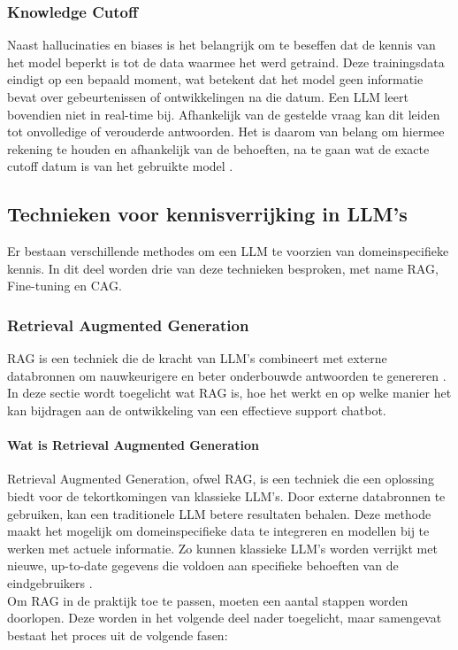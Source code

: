 \subsubsection{Knowledge Cutoff}
Naast hallucinaties en biases is het belangrijk om te beseffen dat de kennis van het model beperkt is tot de data waarmee het werd getraind. Deze trainingsdata eindigt op een bepaald moment, wat betekent dat het model geen informatie bevat over gebeurtenissen of ontwikkelingen na die datum. Een LLM leert bovendien niet in real-time bij. Afhankelijk van de gestelde vraag kan dit leiden tot onvolledige of verouderde antwoorden. Het is daarom van belang om hiermee rekening te houden en afhankelijk van de behoeften, na te gaan wat de exacte cutoff datum is van het gebruikte model \autocite{Hadi2023}.
 
 
\subsection{Technieken voor kennisverrijking in LLM’s}

Er bestaan verschillende methodes om een LLM te voorzien van domeinspecifieke kennis. In dit deel worden drie van deze technieken besproken, met name RAG, Fine-tuning en CAG. 
 
\subsubsection{Retrieval Augmented Generation}

RAG is een techniek die de kracht van LLM’s combineert met externe databronnen om nauwkeurigere en beter onderbouwde antwoorden te genereren \autocite{wu2025retrievalaugmentedgenerationnaturallanguage}. 
In deze sectie wordt toegelicht wat RAG is, hoe het werkt en op welke manier het kan bijdragen aan de ontwikkeling van een effectieve support chatbot.

\paragraph{Wat is Retrieval Augmented Generation}
Retrieval Augmented Generation, ofwel RAG, is een techniek die een oplossing biedt voor de tekortkomingen van klassieke LLM’s. Door externe databronnen te gebruiken, kan een traditionele LLM betere resultaten behalen. Deze methode maakt het mogelijk om domeinspecifieke data te integreren en modellen bij te werken met actuele informatie. Zo kunnen klassieke LLM’s worden verrijkt met nieuwe, up-to-date gegevens die voldoen aan specifieke behoeften van de eindgebruikers \autocite{wu2025retrievalaugmentedgenerationnaturallanguage}.
\\[1em]
Om RAG in de praktijk toe te passen, moeten een aantal stappen worden doorlopen. Deze worden in het volgende deel nader toegelicht, maar samengevat bestaat het proces uit de volgende fasen:

